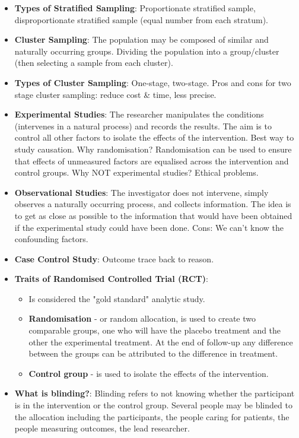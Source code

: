 \documentclass[12pt]{book}
\begin{document}
\begin{itemize}
\item \textbf{Types of Stratified Sampling}: Proportionate stratified sample, disproportionate stratified sample (equal number from each stratum).
\item \textbf{Cluster Sampling}: The population may be composed of similar and naturally occurring groups. Dividing the population into a group/cluster (then selecting a sample from each cluster).
\item \textbf{Types of Cluster Sampling}: One-stage, two-stage. Pros and cons for two stage cluster sampling: reduce cost \& time, less precise.
\item \textbf{Experimental Studies}: The researcher manipulates the conditions (intervenes in a natural process) and records the results. The aim is to control all other factors to isolate the effects of the intervention. Best way to study causation. Why randomisation? Randomisation can be used to ensure that effects of unmeasured factors are equalised across the intervention and control groups. Why NOT experimental studies? Ethical problems.
\item \textbf{Observational Studies}: The investigator does not intervene, simply observes a naturally occurring process, and collects information. The idea is to get as close as possible to the information that would have been obtained if the experimental study could have been done. Cons: We can't know the confounding factors.
\item \textbf{Case Control Study}: Outcome trace back to reason.
\item \textbf{Traits of Randomised Controlled Trial (RCT)}: 
	\begin{itemize}
	\item Is considered the "gold standard" analytic study.
	\item \textbf{Randomisation} - or random allocation, is used to create two comparable groups, one who will have the placebo treatment and the other the experimental treatment. At the end of follow-up any difference between the groups can be attributed to the difference in treatment.
	\item \textbf{Control group} - is used to isolate the effects of the intervention.
	\end{itemize}
\item \textbf{What is blinding?}: Blinding refers to not knowing whether the participant is in the intervention or the control group. Several people may be blinded to the allocation including the participants, the people caring for patients, the people measuring outcomes, the lead researcher.

\end{itemize}
\end{document}
